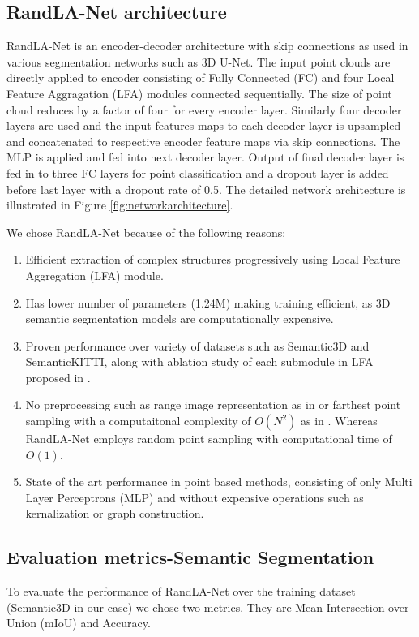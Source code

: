 \subsection{RandLA-Net architecture}
RandLA-Net is an encoder-decoder architecture with skip connections as used in various segmentation networks such as 3D U-Net\cite{wang2018two_3DUnet}.
The input point clouds are directly applied to encoder consisting of Fully Connected (FC) and four Local Feature Aggragation (LFA) modules connected sequentially.
The size of point cloud reduces by a factor of four for every encoder layer. 
Similarly four decoder layers are used and the input features maps to each decoder layer is upsampled and concatenated to respective encoder feature maps via skip connections.
The MLP is applied and fed into next decoder layer.
Output of final decoder layer is fed in to three FC layers for point classification and a dropout layer is added before last layer with a dropout rate of 0.5.
The detailed network architecture is illustrated in Figure \ref{fig:networkarchitecture}.


We chose RandLA-Net because of the following reasons:
\begin{enumerate}
    \item Efficient extraction of complex structures progressively using Local Feature Aggregation (LFA) module.
    \item Has lower number of parameters (1.24M) making training efficient, as 3D semantic segmentation models are computationally expensive.
    \item Proven performance over variety of datasets such as Semantic3D and SemanticKITTI, along with ablation study of each submodule in LFA proposed in \cite{Hu_2020_CVPR_Randla}.
    \item No preprocessing such as range image representation as in \cite{Milioto2019} or farthest point sampling with a computaitonal complexity of $O(N^2)$ as in \cite{Qi_2017_CVPR_pointnet}. Whereas RandLA-Net employs random point sampling with computational time of $O(1)$.
    \item State of the art performance in point based methods, consisting of only Multi Layer Perceptrons (MLP) and without expensive operations such as kernalization or graph construction.
\end{enumerate}

\subsection{Evaluation metrics-Semantic Segmentation}
To evaluate the performance of RandLA-Net over the training dataset (Semantic3D in our case) we chose two metrics.
They are Mean Intersection-over-Union (mIoU) and Accuracy.

